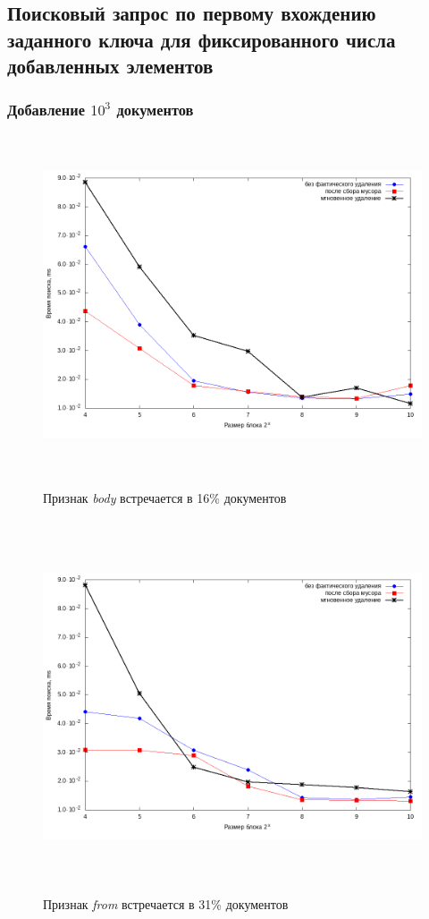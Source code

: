 \subsection{Поисковый запрос по первому вхождению заданного ключа для фиксированного числа добавленных элементов}

\subsubsection{Добавление $10^3$ документов}

\begin{figure}[H]
\includegraphics[width=\linewidth, height=10cm]{fig/limit_1/1e3/body.png}
\caption{Признак \textit{body} встречается в 16\% документов}
\includegraphics[width=\linewidth, height=11cm]{fig/limit_1/1e3/from.png}
\caption{Признак \textit{from} встречается в 31\% документов}
\end{figure}

